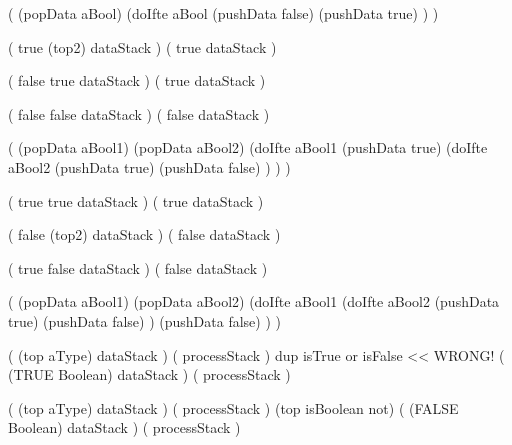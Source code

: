 \startImplementation[ansiC]
  (
    (popData aBool)
    (doIfte aBool
      (pushData false)
      (pushData true)
    )
  )
\stopImplementation
\stopJoyLoLWord

\startJoyLoLWord[or]
\startRule[or-true1]
\preDataStack
  (
    true
    (top2)
    dataStack
  )
\postDataStack
  (
    true
    dataStack
  )
\stopRule

\startRule[or-true2]
\preDataStack
  (
    false
    true
    dataStack
  )
\postDataStack
  (
    true
    dataStack
  )
\stopRule

\startRule[or-false]
\preDataStack
  (
    false
    false
    dataStack
  )
\postDataStack
  (
    false
    dataStack
  )
\stopRule

\startImplementation[ansiC]
  (
    (popData aBool1)
    (popData aBool2)
    (doIfte aBool1
      (pushData true)
      (doIfte aBool2
        (pushData true)
        (pushData false)
      )
    )
  )
\stopImplementation

\stopJoyLoLWord

\startJoyLoLWord[and]

\preDataStack
  (
    true
    true
    dataStack
  )
\postDataStack
  (
    true
    dataStack
  )
\stopRule

\preDataStack
  (
    false
    (top2)
    dataStack
  )
\postDataStack
  (
    false
    dataStack
  )
\stopRule

\preDataStack
  (
    true
    false
    dataStack
  )
\postDataStack
  (
    false
    dataStack
  )
\stopRule

\startImplementation[ansiC]
  (
    (popData aBool1)
    (popData aBool2)
    (doIfte aBool1
      (doIfte aBool2
        (pushData true)
        (pushData false)
      )
      (pushData false)
    )
  )
\stopImplementation

\stopJoyLoLWord

\startJoyLoLWord[isBoolean]

\preDataStack
  (
    (top aType)
    dataStack
  )
\preProcessStack
  (
    processStack
  )
\preCondition
  dup isTrue or isFalse  << WRONG!
\postDataStack
  (
    (TRUE Boolean)
    dataStack
  )
\postProcessStack
  (
    processStack
  )
\stopRule

\preDataStack
  (
    (top aType)
    dataStack
  )
\preProcessStack
  (
    processStack
  )
\preCondition
  (top isBoolean not)
\postDataStack
  (
    (FALSE Boolean)
    dataStack
  )
\postProcessStack
  (
    processStack
  )
\stopRule

